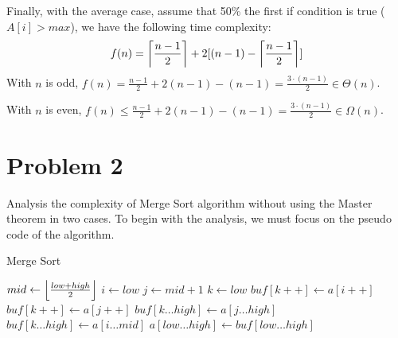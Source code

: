 \documentclass[a4paper]{article}
\DeclarePairedDelimiter\ceil{\lceil}{\rceil}
\DeclarePairedDelimiter\floor{\lfloor}{\rfloor}
\begin{document}
Finally, with the average case, assume that 50\% the first if condition is true ($A[i] > max$), we have the following time complexity: 
\begin{gather*}
    f(n) = \ceil*{\frac{n-1}{2}} + 2[(n-1) - \ceil*{\frac{n-1}{2}}]
\end{gather*}
With $n$ is odd, $f(n) = \frac{n-1}{2} + 2(n-1) - (n-1) = \frac{3\cdot(n-1)}{2} \in \Theta(n)$. \par \bigskip
With $n$ is even, $f(n) \leq \frac{n-1}{2} + 2(n-1) - (n-1) = \frac{3\cdot(n-1)}{2} \in \Omega(n)$.


\newpage
\section{Problem 2}
Analysis the complexity of Merge Sort algorithm without using the Master theorem in two cases. To begin with the analysis, we must focus on the pseudo code of the algorithm. \par
\begin{algorithm}
\renewcommand{\thealgorithm}{}
\caption{Merge Sort}
\begin{algorithmic}
        \State $mid \gets \floor* {\frac{low+high}{2}}$
        \State {}
        \State {}
        \State {}
    \EndIf
\EndProcedure
\bigskip
{}
    \State $i \gets low$
    \State $j \gets mid+1$
    \State $k \gets low$
            \State $buf[k++] \gets a[i++]$
        \Else \State $buf[k++] \gets a[j++]$
        \EndIf
    \EndWhile
        \State $buf[k \ldots high] \gets a[j \ldots high]$
    \Else
        \State $buf[k \ldots high] \gets a[i \ldots mid]$
    \EndIf
    \State $a[low \ldots high] \gets buf[low \ldots high]$
\EndProcedure
\end{algorithmic}
\end{algorithm}
\end{document}
